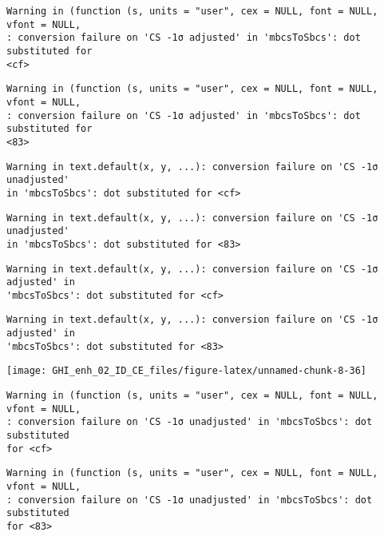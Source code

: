 \documentclass[
  10pt,
  a4paper,oneside]{article}
\begin{document}
\begin{verbatim}
Warning in (function (s, units = "user", cex = NULL, font = NULL, vfont = NULL,
: conversion failure on 'CS -1σ adjusted' in 'mbcsToSbcs': dot substituted for
<cf>
\end{verbatim}

\begin{verbatim}
Warning in (function (s, units = "user", cex = NULL, font = NULL, vfont = NULL,
: conversion failure on 'CS -1σ adjusted' in 'mbcsToSbcs': dot substituted for
<83>
\end{verbatim}

\begin{verbatim}
Warning in text.default(x, y, ...): conversion failure on 'CS -1σ unadjusted'
in 'mbcsToSbcs': dot substituted for <cf>
\end{verbatim}

\begin{verbatim}
Warning in text.default(x, y, ...): conversion failure on 'CS -1σ unadjusted'
in 'mbcsToSbcs': dot substituted for <83>
\end{verbatim}

\begin{verbatim}
Warning in text.default(x, y, ...): conversion failure on 'CS -1σ adjusted' in
'mbcsToSbcs': dot substituted for <cf>
\end{verbatim}

\begin{verbatim}
Warning in text.default(x, y, ...): conversion failure on 'CS -1σ adjusted' in
'mbcsToSbcs': dot substituted for <83>
\end{verbatim}

\begin{center}\texttt{[image: GHI\_enh\_02\_ID\_CE\_files/figure-latex/unnamed-chunk-8-36]} \end{center}

\begin{verbatim}
Warning in (function (s, units = "user", cex = NULL, font = NULL, vfont = NULL,
: conversion failure on 'CS -1σ unadjusted' in 'mbcsToSbcs': dot substituted
for <cf>
\end{verbatim}

\begin{verbatim}
Warning in (function (s, units = "user", cex = NULL, font = NULL, vfont = NULL,
: conversion failure on 'CS -1σ unadjusted' in 'mbcsToSbcs': dot substituted
for <83>
\end{verbatim}
\end{document}
